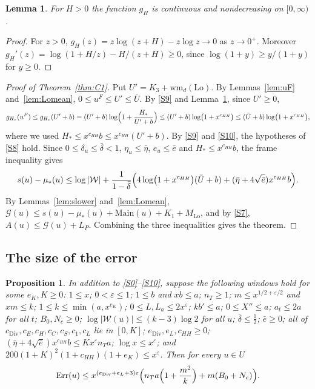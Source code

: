 \documentclass[11pt]{amsart}
\newcommand{\eps}{\varepsilon}
\theoremstyle{plain}
\newtheorem{proposition}[theorem]{Proposition}
\newtheorem{lemma}[theorem]{Lemma}
\theoremstyle{definition}
\numberwithin{equation}{section}
\begin{document}
\begin{lemma}\label{lem:gmono}
For $H>0$ the function $g_H$ is continuous and nondecreasing on $[0,\infty)$.
\end{lemma}

\begin{proof}
For $z>0$, $g_H(z)=z\log(z+H)-z\log z\to0$ as $z\to0^+$. Moreover
$g_H'(z)=\log(1+H/z)-H/(z+H)\ge0$, since $\log(1+y)\ge y/(1+y)$ for $y\ge0$.
\end{proof}

\begin{proof}[Proof of Theorem~\ref{thm:C1}]
Put $U'=K_3+\mathrm{wm}_d(\mathrm{Lo})$. By Lemmas~\ref{lem:uF} and~\ref{lem:Lomean},
$0\le u^F\le U'\le\bar U$. By \ref{S9} and Lemma~\ref{lem:gmono}, since $U'\ge0$,
\[
g_{H_\ast}(u^F)\le g_{H_\ast}(U'+b)=(U'+b)\log\Bigl(1+\frac{H_\ast}{U'+b}\Bigr)\le(U'+b)\log\bigl(1+x^{c_{HH}}\bigr)\le(\bar U+b)\log\bigl(1+x^{c_{HH}}\bigr),
\]
where we used $H_\ast\le x^{c_{HH}}b\le x^{c_{HH}}(U'+b)$. By \ref{S9} and \ref{S10}, the
hypotheses of \ref{S8} hold. Since $0\le\delta_u\le\bar\delta<1$, $\eta_u\le\bar\eta$, $e_u\le\bar e$ and
$H_\ast\le x^{c_{HH}}b$, the frame inequality gives
\[
s(u)-\mu_\ast(u)\le\log|\mathcal W|+\frac{1}{1-\bar\delta}\Bigl(4\log\bigl(1+x^{c_{HH}}\bigr)(\bar U+b)+(\bar\eta+4\sqrt{\bar e})x^{c_{HH}}b\Bigr).
\]
By Lemmas~\ref{lem:slower} and~\ref{lem:Lomean},
$\mathcal G(u)\le s(u)-\mu_\ast(u)+\mathrm{Main}(u)+K_1+M_{\mathrm{Lo}}$, and by \ref{S7},
$A(u)\le\mathcal G(u)+L_P$. Combining the three inequalities gives the theorem.
\end{proof}

\subsection{The size of the error}

\begin{proposition}\label{prop:errsize}
In addition to \ref{S0}--\ref{S10}, suppose the following windows hold for some $e_K,K\ge0$:
$1\le x$; $0<\eps\le1$; $1\le b$ and $xb\le a$; $n_T\ge1$; $m\le x^{1/2+\eps/2}$ and $xm\le k$;
$1\le k\le\min(a,x^{e_K})$; $0\le L,L_a\le2x^{\eps}$; $kb'\le a$; $0\le X''\le a$; $a_t\le2a$ for all
$t$; $B_0,N_c\ge0$; $\log|\mathcal W(u)|\le(k-3)\log2$ for all $u$; $\bar\delta\le\frac12$;
$\bar e\ge0$; all of $c_{\mathrm{Div}},c_E,c_H,c_C,c_S,c_1,c_L$ lie in $[0,K]$;
$e_{\mathrm{Div}},e_L,c_{HH}\ge0$; $(\bar\eta+4\sqrt{\bar e})x^{c_{HH}}b\le Kx^{\eps}n_Ta$;
$\log x\le x^{\eps}$; and $200(1+K)^2(1+c_{HH})(1+e_K)\le x^{\eps}$. Then for every $u\in U$
\[
\mathrm{Err}(u)\le x^{(e_{\mathrm{Div}}+e_L+3)\eps}\Bigl(n_Ta\Bigl(1+\frac{m^2}{k}\Bigr)+m(B_0+N_c)\Bigr).
\]
\end{proposition}
\end{document}
